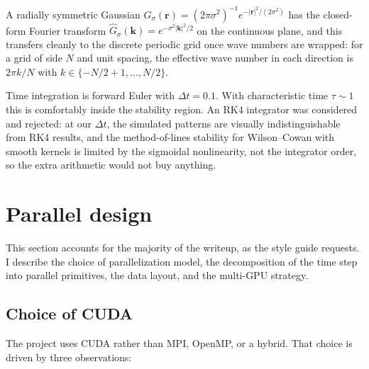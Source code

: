 \documentclass[11pt]{article}
\begin{document}
A radially symmetric Gaussian
$G_{\sigma}(\mathbf{r}) = (2\pi\sigma^{2})^{-1} e^{-|\mathbf{r}|^{2}/(2\sigma^{2})}$
has the closed-form Fourier transform
$\widehat{G}_{\sigma}(\mathbf{k}) = e^{-\sigma^{2} |\mathbf{k}|^{2}/2}$
on the continuous plane, and this transfers cleanly to the discrete
periodic grid once wave numbers are wrapped: for a grid of side $N$
and unit spacing, the effective wave number in each direction is
$2\pi k / N$ with $k \in \{-N/2+1,\ldots, N/2\}$.

Time integration is forward Euler with $\Delta t = 0.1$. With
characteristic time $\tau \!\sim\! 1$ this is comfortably inside the
stability region. An RK4 integrator was considered and rejected: at
our $\Delta t$, the simulated patterns are visually indistinguishable
from RK4 results, and the method-of-lines stability for Wilson--Cowan
with smooth kernels is limited by the sigmoidal nonlinearity, not the
integrator order, so the extra arithmetic would not buy anything.

\section{Parallel design}
\label{sec:parallel}

This section accounts for the majority of the writeup, as the style
guide requests. I describe the choice of parallelization model, the
decomposition of the time step into parallel primitives, the data
layout, and the multi-GPU strategy.

\subsection{Choice of CUDA}

The project uses CUDA rather than MPI, OpenMP, or a hybrid. That
choice is driven by three observations:
\end{document}

